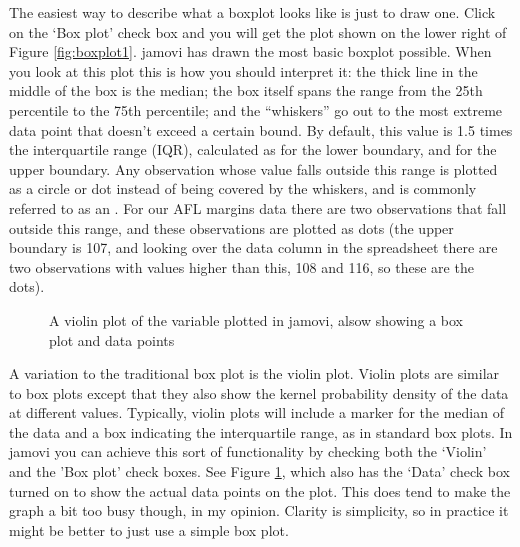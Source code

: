 The easiest way to describe what a boxplot looks like is just to draw one. Click on the `Box plot' check box and you will get the plot shown on the lower right of Figure \ref{fig:boxplot1}. jamovi has drawn the most basic boxplot possible. When you look at this plot this is how you should interpret it: the thick line in the middle of the box is the median; the box itself spans the range from the 25th percentile to the 75th percentile; and the ``whiskers'' go out to the most extreme data point that doesn't exceed a certain bound. By default, this value is 1.5 times the interquartile range (IQR), calculated as  for the lower boundary, and  for the upper boundary. Any observation whose value falls outside this range is plotted as a circle or dot instead of being covered by the whiskers, and is commonly referred to as an . For our AFL margins data there are two observations that fall outside this range, and these observations are plotted as dots (the upper boundary is 107, and looking over the data column in the spreadsheet there are two observations with values higher than this, 108 and 116, so these are the dots). 


\begin{figure}[!!htb]
\begin{center}
\caption{A violin plot of the  variable plotted in jamovi, alsow showing a box plot and data points}
\label{fig:boxplot2}
\HR
\end{center}
\end{figure}

A variation to the traditional box plot is the violin plot. Violin plots are similar to box plots except that they also show the kernel probability density of the data at different values. Typically, violin plots will include a marker for the median of the data and a box indicating the interquartile range, as in standard box plots. In jamovi you can achieve this sort of functionality by checking both the `Violin' and the 'Box plot' check boxes. See Figure \ref{fig:boxplot2}, which also has the `Data' check box turned on to show the actual data points on the plot. This does tend to make the graph a bit too busy though, in my opinion. Clarity is simplicity, so in practice it might be better to just use a simple box plot.


